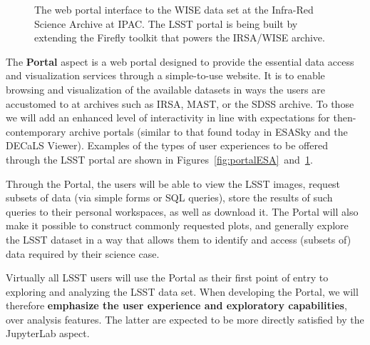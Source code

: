 \documentclass[DM,lsstdraft,toc]{lsstdoc}
\begin{document}
\begin{figure}
	\centering
	\caption{The web portal interface to the WISE data set at the Infra-Red Science Archive at IPAC. The LSST portal is being built by extending the Firefly toolkit that powers the IRSA/WISE archive.
		\label{fig:portalIRSA}}
\end{figure}

The {\bf Portal} aspect is a web portal designed to provide the essential data
access and visualization services through a simple-to-use website.  It is to
enable browsing and visualization of the available datasets in ways the
users are accustomed to at archives such as IRSA, MAST, or the SDSS archive.
To those we will add an enhanced level of interactivity in line with expectations for
then-contemporary archive portals (similar to that found today in ESASky and 
the DECaLS Viewer). Examples of the types of user experiences to be offered
through the LSST portal are shown in Figures~\ref{fig:portalESA}~and~\ref{fig:portalIRSA}.

Through the Portal, the users will be
able to view the LSST images, request subsets of data (via simple forms or
SQL queries), store the results of such queries to their personal
workspaces, as well as download it. The Portal will also make it possible to
construct commonly requested plots, and generally explore the
LSST dataset in a way that allows them to identify and access (subsets of)
data required by their science case.

Virtually all LSST users will use the Portal as their first point of entry to
exploring and analyzing the LSST data set. When developing the Portal,
we will therefore {\bf emphasize the user experience and exploratory
capabilities}, over analysis features. The latter are expected to be more
directly satisfied by the JupyterLab aspect.
\end{document}
